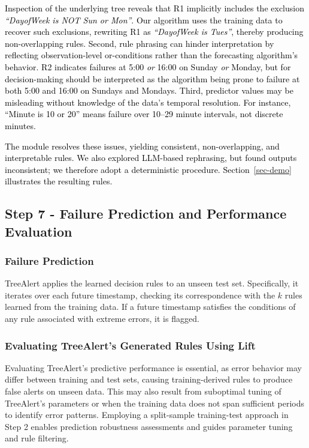 \documentclass[]{interact}
\newcommand{\galit}[1]{\textcolor{black}{#1}}
\newcommand{\matt}[1]{\textcolor{black}{#1}}
\theoremstyle{plain}
\theoremstyle{definition}
\theoremstyle{remark}
\begin{document}
\matt{Inspection of the underlying tree reveals that R1 implicitly includes the exclusion \textit{``DayofWeek is NOT Sun or Mon''}. Our algorithm uses the training data to recover such exclusions, rewriting R1 as \textit{``DayofWeek is Tues''}, thereby producing non-overlapping rules. Second, rule phrasing can hinder interpretation by reflecting observation-level or-conditions rather than the forecasting algorithm's behavior. R2 indicates failures at 5:00 \emph{or} 16:00 on Sunday \emph{or} Monday, but for decision-making should be interpreted as the algorithm being prone to failure at both 5:00 and 16:00 on Sundays and Mondays. Third, predictor values may be misleading without knowledge of the data's temporal resolution. For instance, ``Minute is 10 or 20'' \galit{means} failure over 10--29 minute intervals, not discrete minutes.}

\matt{The module resolves these issues, yielding consistent, non-overlapping, and interpretable rules. We also explored LLM-based rephrasing, but found outputs inconsistent; we therefore adopt a deterministic procedure. Section~\ref{sec-demo} illustrates the resulting rules.}

\subsection{Step 7 - Failure Prediction and Performance Evaluation}

\subsubsection{Failure Prediction}

TreeAlert applies the learned decision rules to an unseen test set. Specifically, it iterates over each future timestamp, checking its correspondence with the $k$ rules learned from the training data. If a future timestamp satisfies the conditions of any rule associated with extreme errors, it is flagged.

\subsubsection{Evaluating TreeAlert's Generated Rules Using Lift}
\label{Sup-A}

Evaluating TreeAlert's predictive performance is essential, as error behavior may differ between training and test sets, causing training-derived rules to produce false alerts on unseen data. This may also result from suboptimal tuning of TreeAlert's parameters or when the training data does not span sufficient periods to identify error patterns. Employing a split-sample training-test approach in Step 2 enables prediction robustness assessments and guides parameter tuning and rule filtering.
\end{document}
